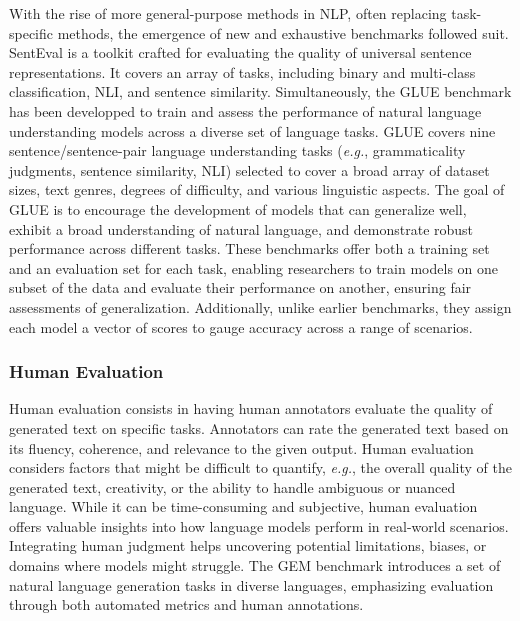 With the rise of more general-purpose methods in \ac{NLP}, often replacing task-specific methods, the emergence of new and exhaustive benchmarks followed suit. SentEval \citep{conneau2018senteval} is a toolkit crafted for evaluating the quality of universal sentence representations. It covers an array of tasks, including binary and multi-class classification, \ac{NLI}, and sentence similarity. Simultaneously, the \ac{GLUE} benchmark \citep{wang2018glue} has been developped to train and assess the performance of natural language understanding models across a diverse set of language tasks. \ac{GLUE} covers nine sentence/sentence-pair language understanding tasks (\textit{e.g.}, grammaticality judgments, sentence similarity, \ac{NLI}) selected to cover a broad array of dataset sizes, text genres, degrees of difficulty, and various linguistic aspects. The goal of \ac{GLUE} is to encourage the development of models that can generalize well, exhibit a broad understanding of natural language, and demonstrate robust performance across different tasks. 
These benchmarks offer both a training set and an evaluation set for each task, enabling researchers to train models on one subset of the data and evaluate their performance on another, ensuring fair assessments of generalization. Additionally, unlike earlier benchmarks, they assign each model a vector of scores to gauge accuracy across a range of scenarios.


\subsubsection{Human Evaluation} 

Human evaluation consists in having human annotators evaluate the quality of generated text on specific tasks. Annotators can rate the generated text based on its fluency, coherence, and relevance to the given output. Human evaluation considers factors that might be difficult to quantify, \textit{e.g.}, the overall quality of the generated text, creativity, or the ability to handle ambiguous or nuanced language. While it can be time-consuming and subjective, human evaluation offers valuable insights into how language models perform in real-world scenarios. Integrating human judgment helps uncovering potential limitations, biases, or domains where models might struggle. The \ac{GEM} benchmark \citep{gehrmann2021gem} introduces a set of natural language generation tasks in diverse languages, emphasizing evaluation through both automated metrics and human annotations. 


